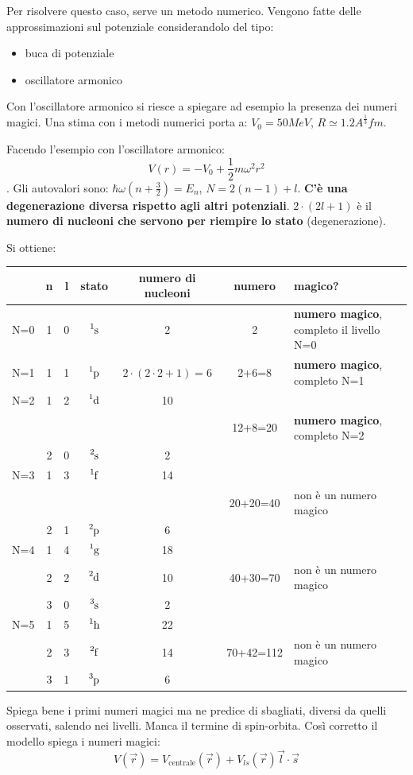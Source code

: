 \documentclass[a4paper,11pt,twoside,openany]{book}
\theoremstyle{definition}
\theoremstyle{plain}
\theoremstyle{plain}
\theoremstyle{definition}
\begin{document}
Per risolvere questo caso, serve un metodo numerico. Vengono fatte delle approssimazioni sul potenziale considerandolo del tipo:
\begin{itemize}
\item buca di potenziale
\item oscillatore armonico
\end{itemize}

Con l'oscillatore armonico si riesce a spiegare ad esempio la presenza dei numeri magici. Una stima con i metodi numerici porta a: $V_0=\si{50 MeV}$, $R\simeq 1.2A^{\frac{1}{3}}\si{fm}$.

Facendo l'esempio con l'oscillatore armonico: $$V(r)=-V_0+\frac{1}{2}m\omega^2r^2$$. Gli autovalori sono: $\hbar \omega\left(n+\frac{3}{2}\right)=E_n$, $N=2(n-1)+l$. \textbf{C'è una degenerazione diversa rispetto agli altri potenziali}. $2\cdot(2l+1)$ è il \textbf{numero di nucleoni che servono per riempire lo stato} (degenerazione).

Si ottiene:

\begin{center}\begin{tabularx}{\textwidth}{ccccccX}
\toprule
& n & l & stato & numero di nucleoni & numero & magico?\\
\midrule
N=0 & 1 & 0 & $\ce{^1s}$ & 2 & 2 & \textbf{numero magico}, completo il livello N=0\\
\midrule
N=1 & 1 & 1 & $\ce{^1p}$ & $2\cdot \left(2\cdot 2+1\right)=6$ & 2+6=8 & \textbf{numero magico}, completo N=1\\
\midrule
N=2 & 1 & 2 & $\ce{^1d}$ & 10 & & \\
& & & & & 12+8=20 & \textbf{numero magico}, completo N=2\\
& 2 & 0 & $\ce{^2s}$ & 2 &  & \\
\midrule
N=3 & 1 & 3 & $\ce{^1f}$ & 14 & & \\
& & & & & 20+20=40 & non è un numero magico\\
& 2 & 1 & $\ce{^2p}$ & 6 & & \\
\midrule
N=4 & 1 & 4 & $\ce{^1g}$ & 18 & & \\
& 2 & 2 & $\ce{^2d}$ & 10 & 40+30=70 & non è un numero magico\\
& 3 & 0 & $\ce{^3s}$ & 2 & & \\
\midrule
N=5 & 1 & 5 & $\ce{^1h}$ & 22 & & \\
& 2 & 3 & $\ce{^2f}$ & 14 & 70+42=112 & non è un numero magico\\
& 3 & 1 & $\ce{^3p}$ & 6 & & \\
\bottomrule
\end{tabularx}\end{center}
Spiega bene i primi numeri magici ma ne predice di sbagliati, diversi da quelli osservati, salendo nei livelli. Manca il termine di spin-orbita. Così corretto il modello spiega i numeri magici:
\begin{equation}
V(\vec r)=V_{\textrm{centrale}}(\vec r)+V_{ls}(\vec r)\vec l\cdot\vec s
\end{equation}
\end{document}
